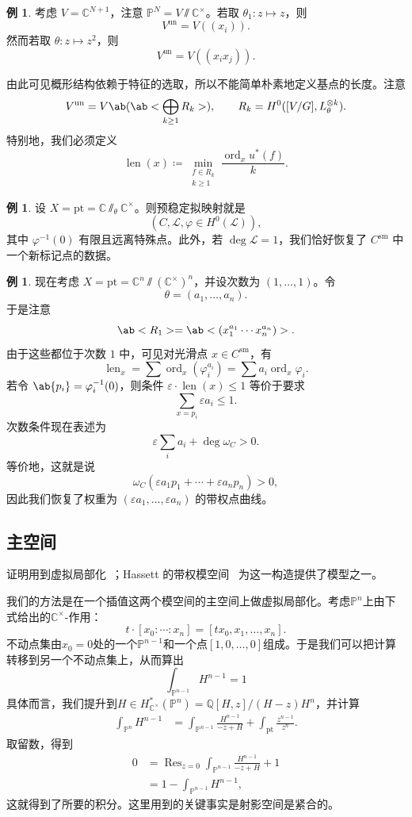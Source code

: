 \documentclass{amsart}
\theoremstyle{definition}
\newtheorem{exm}[thm]{例}
\theoremstyle{remark}
\theoremstyle{plain}
\theoremstyle{definition}
\theoremstyle{remark}
\newcommand{\C}{\mathbb{C}}
\newcommand{\Q}{\mathbb{Q}}
\renewcommand{\P}{\mathbb{P}}
\newcommand{\ep}{\varepsilon}
\newcommand{\mc}[1]{\mathcal{#1}}
\newcommand{\mr}[1]{\mathrm{#1}}
\newcommand{\on}[1]{\operatorname{#1}}
\newcommand{\1}{\mathbf{1}}
\newcommand{\2}{\mathbf{2}}
\newcommand{\3}{\mathbf{3}}
\begin{document}
\begin{exm}
    考虑 \(V = \C^{N+1}\)，注意 \(\P^N = V \sslash \C^{\times}\)。若取 \(\theta_1 \colon z \mapsto z\)，则
    \[ V^{\on{un}} = V((x_i)). \]
    然而若取 \(\theta \colon z \mapsto z^2\)，则
    \[ V^{\on{un}} = V((x_i x_j)). \]
\end{exm}

由此可见概形结构依赖于特征的选取，所以不能简单朴素地定义基点的长度。注意
\[ V^{\on{un}} = V\ab(\ab< \bigoplus_{k \geq 1} R_k>), \qquad R_k = H^0([V/G], L_{\theta}^{\otimes k}). \]
特别地，我们必须定义
\[ \on{len}(x) \coloneqq \min_{\substack{f \in R_k \\ k \geq 1}} \frac{\on{ord}_x u^*(f)}{k}. \]

\begin{exm}
    设 \(X = \mr{pt} = \C \sslash_{\theta} \C^{\times}\)。则预稳定拟映射就是
    \[ (C, \mc{L}, \varphi \in H^0(\mc{L})), \]
    其中 \(\varphi^{-1}(0)\) 有限且远离特殊点。此外，若 \(\deg \mc{L} = 1\)，我们恰好恢复了 \(C^{\mr{sm}}\) 中一个新标记点的数据。
\end{exm}

\begin{exm}
    现在考虑 \(X = \mr{pt} = \C^n \sslash (\C^{\times})^n\)，并设次数为 \((1, \ldots, 1)\)。令
    \[ \theta = (a_1, \ldots, a_n). \]
    于是注意
    \[ \ab<R_1> = \ab<(x_1^{a_1} \cdots x_n^{a_n})>. \]
    由于这些都位于次数 \(1\) 中，可见对光滑点 \(x \in C^{\mr{sm}}\)，有
    \[ \on{len}_x = \sum \on{ord}_x (\varphi_i^{a_i}) = \sum a_i \on{ord}_x \varphi_i. \]
    若令 \(\ab\{p_i\} = \varphi_i^{-1}(0)\)，则条件 \(\ep \cdot \on{len}(x) \leq 1\) 等价于要求
    \[ \sum_{x = p_i} \ep a_i \leq 1. \]
    次数条件现在表述为
    \[ \ep \sum_i a_i + \deg \omega_C > 0. \]
    等价地，这就是说
    \[ \omega_C(\ep a_1 p_1 + \cdots + \ep a_n p_n) > 0, \]
    因此我们恢复了权重为 \((\ep a_1, \ldots, \ep a_n)\) 的带权点曲线。
\end{exm}

\subsection{主空间}%
\label{sub:Master space}

证明用到虚拟局部化~\cite{GP1999}；Hassett 的带权模空间~\cite{Hassett2003} 为这一构造提供了模型之一。

我们的方法是在一个插值这两个模空间的主空间上做虚拟局部化。考虑\(\P^n\)上由下式给出的\(\C^{\times}\)-作用：
\[ t \cdot [x_0 : \cdots : x_n] = [t x_0, x_1, \ldots, x_n]. \]
不动点集由\(x_0 = 0\)处的一个\(\P^{n-1}\)和一个点\([1, 0, \ldots, 0]\)组成。于是我们可以把计算转移到另一个不动点集上，从而算出
\[ \int_{\P^{n-1}} H^{n-1} = 1 \]
具体而言，我们提升到\(H \in H_{\C^{\times}}^* (\P^n) = \Q[H,z] / (H-z)H^n\)，并计算
\begin{align*}
    \int_{\P^n} H^{n-1} &= \int_{\P^{n-1}} \frac{H^{n-1}}{-z+H} + \int_{\mr{pt}} \frac{z^{n-1}}{z^n}.
\end{align*}
取留数，得到
\begin{align*}
    0 &= \on{Res}_{z = 0}\int_{\P^{n-1}} \frac{H^{n-1}}{-z+H} + 1 \\
    &= 1 - \int_{\P^{n-1}}H^{n-1},
\end{align*}
这就得到了所要的积分。这里用到的关键事实是射影空间是紧合的。
\end{document}
